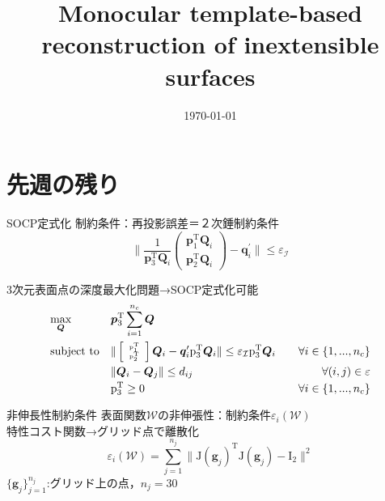 \documentclass[dvipdfmx]{beamer}
\title{Monocular template-based reconstruction of inextensible surfaces  \cite{Perriollat2011}}
\date{\today}
\author{}
\institute{}
\begin{document}
  \maketitle
  \section{先週の残り}
  \begin{frame}{SOCP定式化}
    制約条件：再投影誤差＝２次錘制約条件
    \begin{equation}
        \| 
        \frac{1}{\mathrm{\bm{p}}_3^{\mathrm{T}} \bm{Q}_i} \left(
        \begin{array}{c}
          \mathrm{\bm{p}}_1^{\mathrm{T}} \bm{Q}_i  \\
          \mathrm{\bm{p}}_2^{\mathrm{T}} \bm{Q}_i
        \end{array}
      \right)
     - \bm{q}_i^{\prime}\| \le \varepsilon_{\mathcal{I}}
     \label{eq:cons_tmp_img}
    \end{equation}

    3次元表面点の深度最大化問題→SOCP定式化可能 \\
    \begin{equation}
        \begin{aligned}
            & \underset{\bm{Q}} {\text{max}} && {\bm{p}}_3^{\mathrm{T}} \sum_{i=1}^{n_c} \bm{Q}\\
        &\text{subject to} &&
            \tiny
            \| 
            \left[
            \begin{array}{c}
              \mathrm{\bm{p}}_1^{\mathrm{T}}  \\
              \mathrm{\bm{p}}_2^{\mathrm{T}}
            \end{array}
            \right] \bm{Q}_i
          - \bm{q}_i^{\prime}\mathrm{\bm{p}}_3^{\mathrm{T}} \bm{Q}_i \| \le \varepsilon_{\mathcal{I}} \mathrm{\bm{p}}_3^{\mathrm{T}} \bm{Q}_i \normalsize &&& \forall i \in \{1, ..., n_c\}\\
        &                  && \| \bm{Q}_i -\bm{Q}_j\| \le d_{ij}  &&& \forall(i, j) \in \varepsilon \\
        &                  && \mathrm{\bm{p}}_3^{\mathrm{T}} \ge 0  &&&  \forall i \in \{1, ..., n_c\}
        \end{aligned}
        \label{eq:socp}
    \end{equation}
  \end{frame}
  \begin{frame}{非伸長性制約条件}
      表面関数$\mathcal{W}$の非伸張性：制約条件$\varepsilon_i(\mathcal{W})$ \\
      特性コスト関数→グリッド点で離散化 \\
      \begin{equation}
          \varepsilon_i(\mathcal{W})=\sum_{j=1}^{n_j}\|\mathrm{J}(\bm{g}_j)^{\mathrm{T}}\mathrm{J}(\bm{g}_j) - \mathrm{I}_2 \|^2
          \label{eq:isometry_orthonormal}
      \end{equation}
      $\{\bm{g}_j\}_{j=1}^{n_j}$:グリッド上の点，$n_j = 30$
  \end{frame}
\end{document}
